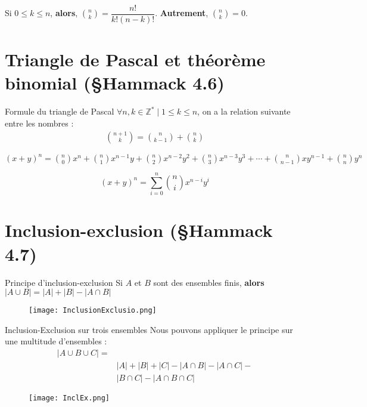\documentclass[8pt]{report}
\begin{document}
\begin{multicols*}{2}
\begin{Theorem}{}
  Si $0 \leq k \leq n$, \textbf{alors}, ${n \choose k} =  \dfrac{n!}{k!(n-k)!}$. 
  \textbf{Autrement}, ${n \choose k} = 0$. 
\end{Theorem}

\section{Triangle de Pascal et théorème binomial (\S Hammack 4.6)}

\begin{Concept}{Formule du triangle de Pascal}{}
  $\forall n, k \in \mathbb{Z}^* \; | \; 1 \leq k \leq n$, on a la relation suivante 
  entre les nombres : 
  \begin{align*}
    { n + 1\choose k} = {n \choose k -1} + {n \choose k}       
  \end{align*}
\end{Concept}

\begin{Theorem}{}{}
  $(x+y)^n = {n \choose 0}x^n + {n \choose 1}x^{n-1}y+ {n \choose 2}x^{n-2}y^2 + 
  {n \choose 3}x^{n-3}y^3 +\cdots+ {n \choose n-1}xy^{n-1} + 
  {n \choose n}y^n$
  \begin{center}
    $$(x+y)^n = \sum_{i=0}^{n}{n \choose i}x^{n-i}y^i$$
  \end{center}
\end{Theorem}

\section{Inclusion-exclusion (\S Hammack 4.7)}
\begin{Definitionx*}{Principe d'inclusion-exclusion}{}
    Si $A$ et $B$ sont des ensembles finis, \textbf{alors} $|A \cup B| =  |A| + |B| - |A \cap B|$ 
\end{Definitionx*}


\begin{figure}[H]
    \begin{center}
        \texttt{[image: InclusionExclusio.png]}
    \end{center}
\end{figure}

\begin{Definitionx*}{Inclusion-Exclusion sur trois ensembles}{}
    Nous pouvons appliquer le principe sur une multitude d'ensembles : 
    \begin{align*}
             |A \cup B \cup C| =  \\ 
                            & |A| + |B| + |C| - |A \cap B| - |A \cap C| - \\ 
                            & |B \cap C| - |A \cap B \cap C|
    \end{align*}
\end{Definitionx*}
    \begin{figure}[H]
    \begin{center}
        \texttt{[image: InclEx.png]}
    \end{center}
\end{figure}


\end{multicols*}
\end{document}
